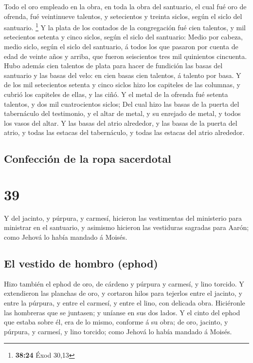  Todo el oro empleado en la obra, en toda la obra del
santuario, el cual fué oro de ofrenda, fué veintinueve talentos, y
setecientos y treinta siclos, según el siclo del santuario. \footnote{\textbf{38:24}
  Éxod 30,13}  Y la plata de los contados de la
congregación fué cien talentos, y mil setecientos setenta y cinco
siclos, según el siclo del santuario:  Medio por cabeza,
medio siclo, según el siclo del santuario, á todos los que pasaron por
cuenta de edad de veinte años y arriba, que fueron seiscientos tres mil
quinientos cincuenta.  Hubo además cien talentos de plata
para hacer de fundición las basas del santuario y las basas del velo: en
cien basas cien talentos, á talento por basa.  Y de los
mil setecientos setenta y cinco siclos hizo los capiteles de las
columnas, y cubrió los capiteles de ellas, y las ciñó.  Y
el metal de la ofrenda fué setenta talentos, y dos mil cuatrocientos
siclos;  Del cual hizo las basas de la puerta del
tabernáculo del testimonio, y el altar de metal, y su enrejado de metal,
y todos los vasos del altar.  Y las basas del atrio
alrededor, y las basas de la puerta del atrio, y todas las estacas del
tabernáculo, y todas las estacas del atrio alrededor.

\hypertarget{confecciuxf3n-de-la-ropa-sacerdotal}{%
\subsection{Confección de la ropa
sacerdotal}\label{confecciuxf3n-de-la-ropa-sacerdotal}}

\hypertarget{section-38}{%
\section{39}\label{section-38}}

 Y del jacinto, y púrpura, y carmesí, hicieron las
vestimentas del ministerio para ministrar en el santuario, y asimismo
hicieron las vestiduras sagradas para Aarón; como Jehová lo había
mandado á Moisés.

\hypertarget{el-vestido-de-hombro-ephod-1}{%
\subsection{El vestido de hombro
(ephod)}\label{el-vestido-de-hombro-ephod-1}}

 Hizo también el ephod de oro, de cárdeno y púrpura y
carmesí, y lino torcido.  Y extendieron las planchas de
oro, y cortaron hilos para tejerlos entre el jacinto, y entre la
púrpura, y entre el carmesí, y entre el lino, con delicada obra.
 Hiciéronle las hombreras que se juntasen; y uníanse en
sus dos lados.  Y el cinto del ephod que estaba sobre él,
era de lo mismo, conforme á su obra; de oro, jacinto, y púrpura, y
carmesí, y lino torcido; como Jehová lo había mandado á Moisés.

